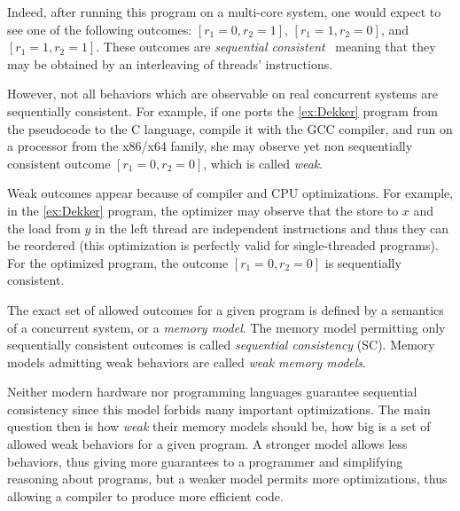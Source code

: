 Indeed, after running this program on a multi-core system, one would expect to see 
one of the following outcomes: $[r_1=0, r_2=1]$, $[r_1=1,r_2=0]$, and $[r_1=1,r_2=1]$.
These outcomes are \emph{sequential consistent}~\cite{Lamport:TC79} meaning
that they may be obtained by an interleaving of threads' instructions.



However, not all behaviors which are observable on real concurrent systems are sequentially consistent. 
For example, if one ports the \ref{ex:Dekker} program
from the pseudocode to the C language, compile it with the GCC compiler, 
and run on a processor from the x86/x64 family,
she may observe yet non sequentially consistent outcome $[r_1=0, r_2=0]$,
which is called \emph{weak}.

Weak outcomes appear because of compiler and CPU optimizations.
For example, in the \ref{ex:Dekker} program,
the optimizer may observe that the store to $x$ and the load from $y$ in the left thread
are independent instructions and thus they can be reordered
(this optimization is perfectly valid for single-threaded programs).
For the optimized program, the outcome $[r_1=0, r_2=0]$
is sequentially consistent.

The exact set of allowed outcomes for a given program 
is defined by a semantics of a concurrent system, or a \emph{memory model}.
The memory model permitting only sequentially consistent outcomes 
is called \emph{sequential consistency} (SC).
Memory models admitting weak behaviors are called \emph{weak memory models}.

Neither modern hardware nor programming languages 
guarantee sequential consistency since this model forbids many important optimizations.
The main question then is how \emph{weak} their memory models should be,
\ie how big is a set of allowed weak behaviors for a given program.
A stronger model allows less behaviors, thus giving more guarantees to a programmer
and simplifying reasoning about programs, but a weaker model permits more optimizations,
thus allowing a compiler to produce more efficient code.

